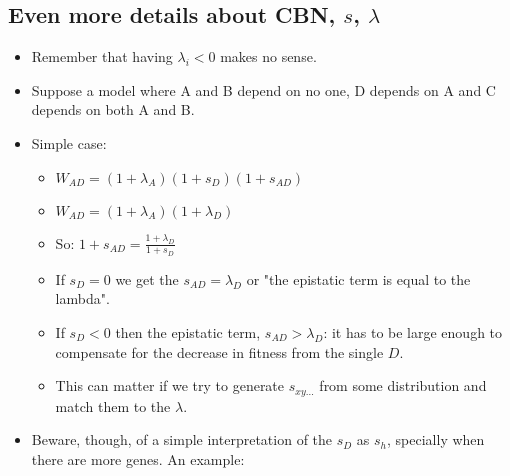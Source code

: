\documentclass[11pt]{article}
\begin{document}
\subsection{Even more details about CBN, \(s\), \(\lambda\)}
\label{sec:orgcc4dcbe}
\begin{itemize}
\item Remember that having \(\lambda_i < 0\) makes no sense.

\item Suppose a model where A and B depend on no one, D depends on A and C depends on both A and B.

\item Simple case:
\begin{itemize}
\item \(W_{AD} = (1 + \lambda_A) (1 + s_D) (1 + s_{AD})\)
\item \(W_{AD} = (1 + \lambda_A) (1 + \lambda_D)\)
\item So: \(1 + s_{AD} = \frac{1 + \lambda_D}{1 + s_D}\)
\item If \(s_D = 0\) we get the \(s_{AD} = \lambda_D\) or "the epistatic term is     equal to the lambda".
\item If \(s_D < 0\) then the epistatic term, \(s_{AD} > \lambda_D\): it has to be large enough to compensate for the decrease in fitness from the single \(D\).
\item This can matter if we try to generate \(s_{xy\ldots}\) from some
distribution and match them to the \(\lambda\).
\end{itemize}

\item Beware, though, of a simple interpretation of the \(s_D\) as \(s_h\),
specially when there are more genes. An example:


\end{itemize}
\end{document}
